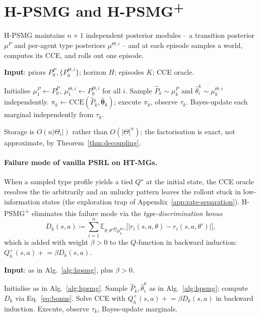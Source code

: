 \section{H-PSMG and H-PSMG\textsuperscript{+}}
\label{sec:algorithm}

H-PSMG maintains $n{+}1$ independent posterior modules -- a transition posterior $\mu^P$ and per-agent type posteriors $\mu^{\Theta,i}$ -- and at each episode samples a world, computes its CCE, and rolls out one episode.

\begin{algorithm}[t]
\caption{H-PSMG}\label{alg:hpsmg}
\textbf{Input}: priors $P_0^P,\{P_0^{\Theta,i}\}$; horizon $H$; episodes $K$; CCE oracle.\\
\begin{algorithmic}[1]
\STATE Initialise $\mu_1^P\!\gets\! P_0^P$, $\mu_1^{\Theta,i}\!\gets\! P_0^{\Theta,i}$ for all $i$.
  \STATE Sample $\hat P_k\!\sim\!\mu_k^P$ and $\hat\theta_i^k\!\sim\!\mu_k^{\Theta,i}$ independently.
  \STATE $\pi_k\gets\mathrm{CCE}(\hat P_k,\hat{\boldsymbol\theta}_k)$; execute $\pi_k$, observe $\tau_k$.
  \STATE Bayes-update each marginal independently from $\tau_k$.
\ENDFOR
\end{algorithmic}
\end{algorithm}

Storage is $O(n|\Theta_i|)$ rather than $O(|\Theta|^n)$; the factorisation is exact, not approximate, by Theorem~\ref{thm:decoupling}.

\paragraph{Failure mode of vanilla PSRL on HT-MGs.} When a sampled type profile yields a tied $Q^\star$ at the initial state, the CCE oracle resolves the tie arbitrarily and an unlucky pattern leaves the rollout stuck in low-information states (the exploration trap of Appendix~\ref{app:rate-separation}). H-PSMG\textsuperscript{+} eliminates this failure mode via the \emph{type-discrimination bonus}
\begin{equation}
\label{eq:bonus}
D_k(s,a)\coloneqq\sum_{i=1}^n\mathbb{E}_{\theta,\theta'\stackrel{\mathrm{iid}}{\sim}\mu_k^{\Theta,i}}\!\big[|r_i(s,a,\theta)-r_i(s,a,\theta')|\big],
\end{equation}
which is added with weight $\beta>0$ to the $Q$-function in backward induction: $Q^+_h(s,a)\mathrel{+}=\beta D_k(s,a)$.

\begin{algorithm}[t]
\caption{H-PSMG\textsuperscript{+}}\label{alg:hpsmg-plus}
\textbf{Input}: as in Alg.~\ref{alg:hpsmg}, plus $\beta>0$.\\
\begin{algorithmic}[1]
\STATE Initialise as in Alg.~\ref{alg:hpsmg}.
  \STATE Sample $\hat P_k,\hat\theta_i^k$ as in Alg.~\ref{alg:hpsmg}; compute $D_k$ via Eq.~\eqref{eq:bonus}.
  \STATE Solve CCE with $Q^+_h(s,a)\mathrel{+}=\beta D_k(s,a)$ in backward induction.
  \STATE Execute, observe $\tau_k$, Bayes-update marginals.
\ENDFOR
\end{algorithmic}
\end{algorithm}

